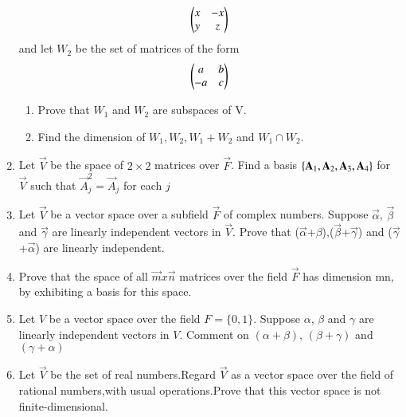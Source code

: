\begin{enumerate}[label=\thesubsection.\arabic*.,ref=\thesubsection.\theenumi]
\begin{align}
    \begin{pmatrix}x&-x\\y&z\end{pmatrix}
\end{align}
and let $W_2$ be the set of matrices of the form 
\begin{align}
    \begin{pmatrix}a&b\\-a&c\end{pmatrix}
\end{align}
%
\begin{enumerate}
    \item Prove that $W_1$ and $W_2$ are subspaces of V.
    \item Find the dimension of $W_1, W_2, W_1+W_2$ and $W_1\cap W_2$.
\end{enumerate}
%
\solution

%
\item Let $\vec{V}$ be the space of $2\times2$ matrices over $\vec{F}$. Find a basis $\left\{\mathbf{A}_1, \mathbf{A}_2, \mathbf{A}_3, \mathbf{A}_4\right\}$ for $\vec{V}$ such that $\vec{A}_j^2 = \vec{A}_j$ for each $j$
%
\\
\solution

%
\item    Let $\vec{V}$ be a vector space over a subfield $\vec{F}$ of complex numbers. Suppose $\vec{\alpha}$, $\vec{\beta}$ and $\vec{\gamma}$ are linearly independent vectors in $\vec{V}$. Prove that ($\vec{\alpha}$+$\beta$),($\vec{\beta}$+$\vec{\gamma}$) and ($\vec{\gamma}$+$\vec{\alpha}$) are linearly independent.
%
\\
\solution

%
\item Prove that the space of all $\vec{m} x \vec{n}$ matrices over the field $\vec{F}$ has dimension mn, by exhibiting a basis for this space. 
%
\\
\solution

%
\item Let $V$ be a vector space over the field $F = \{0,1\}$. Suppose $\alpha$, $\beta$ and $\gamma$ are linearly independent vectors in $V$. Comment on $(\alpha + \beta)$, $(\beta + \gamma)$ and $(\gamma + \alpha)$
%
\\
\solution

\item Let $\vec{V}$ be the set of real numbers.Regard  $\vec{V}$  as a vector space over the field of rational numbers,with usual operations.Prove that this vector space is not finite-dimensional.
\\
\solution

\end{enumerate}
